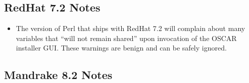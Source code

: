 
\subsection{RedHat 7.2 Notes}
\label{subsec:rh72notes}

\begin{itemize}
\item The version of Perl that ships with RedHat 7.2 will complain
  about many variables that ``will not remain shared'' upon invocation
  of the OSCAR installer GUI.  These warnings are benign and can be
  safely ignored.
\end{itemize}


\subsection{Mandrake 8.2 Notes}
\label{subsec:mdk82notes}

